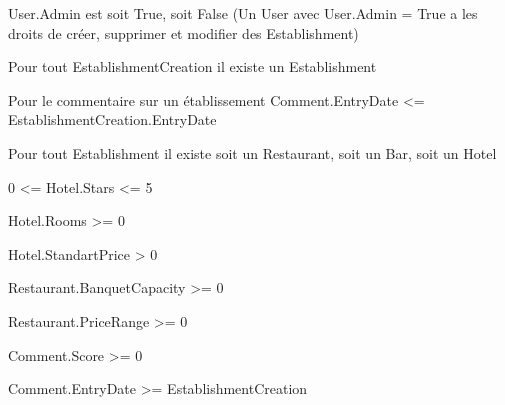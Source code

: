 \documentclass[11pt,a4paper]{report}
\begin{document}
\pagebreak
User.Admin est soit True, soit False (Un User avec User.Admin = True a les droits de créer, supprimer et modifier des Establishment)

Pour tout EstablishmentCreation il existe un Establishment

Pour le commentaire sur un établissement Comment.EntryDate <= EstablishmentCreation.EntryDate

Pour tout Establishment il existe soit un Restaurant, soit un Bar, soit un Hotel

0 <= Hotel.Stars <= 5

Hotel.Rooms >= 0

Hotel.StandartPrice > 0

Restaurant.BanquetCapacity >= 0

Restaurant.PriceRange >= 0

Comment.Score >= 0

Comment.EntryDate >= EstablishmentCreation 
\end{document}
